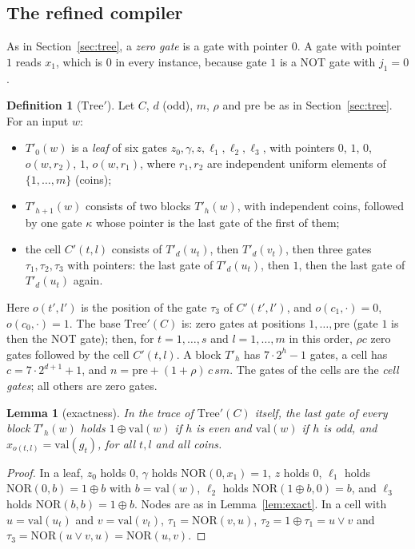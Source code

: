 \documentclass[11pt]{amsart}
\newtheorem{lemma}[theorem]{Lemma}
\theoremstyle{definition}
\newtheorem{definition}[theorem]{Definition}
\theoremstyle{remark}
\newcommand{\NOR}{\mathrm{NOR}}
\newcommand{\val}{\mathrm{val}}
\begin{document}
\subsection{The refined compiler}

As in Section~\ref{sec:tree}, a \emph{zero gate} is a gate with pointer $0$. A gate with pointer
$1$ reads $x_1$, which is $0$ in every instance, because gate $1$ is a NOT gate with $j_1=0$.

\begin{definition}[$\mathrm{Tree}'$]\label{def:treeprime}
Let $C$, $d$ (odd), $m$, $\rho$ and $\mathrm{pre}$ be as in Section~\ref{sec:tree}. For an input $w$:
\begin{itemize}[leftmargin=2em]
\item $T'_0(w)$ is a \emph{leaf} of six gates $z_0,\gamma,z,\ell_1,\ell_2,\ell_3$, with pointers $0$,
$1$, $0$, $o(w,r_2)$, $1$, $o(w,r_1)$, where $r_1,r_2$ are independent uniform elements of
$\{1,\dots,m\}$ (coins);
\item $T'_{h+1}(w)$ consists of two blocks $T'_h(w)$, with independent coins, followed by one gate
$\kappa$ whose pointer is the last gate of the first of them;
\item the cell $C'(t,l)$ consists of $T'_d(u_t)$, then $T'_d(v_t)$, then three gates
$\tau_1,\tau_2,\tau_3$ with pointers: the last gate of $T'_d(u_t)$, then $1$, then the last gate of
$T'_d(u_t)$ again.
\end{itemize}
Here $o(t',l')$ is the position of the gate $\tau_3$ of $C'(t',l')$, and $o(c_1,\cdot)=0$,
$o(c_0,\cdot)=1$. The base $\mathrm{Tree}'(C)$ is: zero gates at positions $1,\dots,\mathrm{pre}$
(gate $1$ is then the NOT gate); then, for $t=1,\dots,s$ and $l=1,\dots,m$ in this order, $\rho c$
zero gates followed by the cell $C'(t,l)$. A block $T'_h$ has $7\cdot2^h-1$ gates, a cell has
$c=7\cdot2^{d+1}+1$, and $n=\mathrm{pre}+(1+\rho)\,c\,sm$. The gates of the cells are the
\emph{cell gates}; all others are zero gates.
\end{definition}

\begin{lemma}[exactness]\label{lem:exact2}
In the trace of $\mathrm{Tree}'(C)$ itself, the last gate of every block $T'_h(w)$ holds
$1\oplus\val(w)$ if $h$ is even and $\val(w)$ if $h$ is odd, and $x_{o(t,l)}=\val(g_t)$, for all
$t,l$ and all coins.
\end{lemma}

\begin{proof}
In a leaf, $z_0$ holds $0$, $\gamma$ holds $\NOR(0,x_1)=1$, $z$ holds $0$, $\ell_1$ holds
$\NOR(0,b)=1\oplus b$ with $b=\val(w)$, $\ell_2$ holds $\NOR(1\oplus b,0)=b$, and $\ell_3$ holds
$\NOR(b,b)=1\oplus b$. Nodes are as in Lemma~\ref{lem:exact}. In a cell with $u=\val(u_t)$ and
$v=\val(v_t)$, $\tau_1=\NOR(v,u)$, $\tau_2=1\oplus\tau_1=u\vee v$ and
$\tau_3=\NOR(u\vee v,u)=\NOR(u,v)$.
\end{proof}
\end{document}
